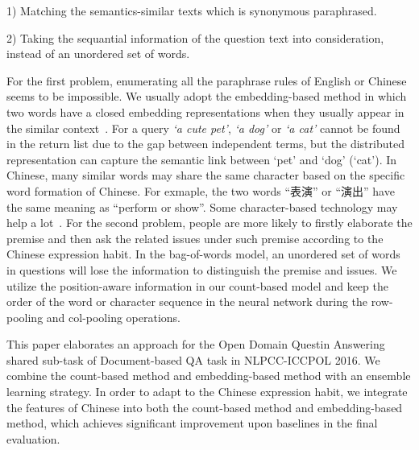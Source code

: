 \documentclass{llncs}
\begin{document}
1) Matching the semantics-similar texts which is synonymous paraphrased.  

2) Taking the sequantial information of the question text into consideration, instead of an unordered set of words.

For the first problem, enumerating all the paraphrase rules of English or Chinese seems to be impossible. We usually adopt the embedding-based method in which two words  have a closed embedding representations when they usually appear in the similar context~\cite{Mikolov2013Distributed}. For a query \emph{`a cute pet'}, \emph{`a dog'} or \emph{`a cat'} cannot be found in the return list due to the gap between independent terms, but the distributed representation can capture the semantic link between `pet' and `dog' (`cat'). In Chinese, many similar words may share the same character based on the specific word formation of Chinese. For exmaple, the two words ``表演'' or ``演出'' have the same meaning as ``perform or show''. Some character-based technology may help a lot~\cite{Sun2014Radical}.  
For the second problem, people are more likely to firstly elaborate the premise and then ask the related issues under such premise according to the Chinese expression habit. In the bag-of-words model, an unordered set of words in questions will lose the information to distinguish the premise and issues.
We utilize the position-aware information in our count-based model and keep the order of the word or character sequence in the neural network during the row-pooling and col-pooling operations. 

This paper elaborates an approach for the Open Domain Questin Answering shared sub-task of Document-based QA task in NLPCC-ICCPOL 2016. We combine the count-based method and embedding-based method with an ensemble learning strategy. In order to adapt to the Chinese expression habit, we integrate the features of Chinese into both the count-based method and embedding-based method, which achieves significant improvement upon baselines in the final evaluation.

\end{document}
